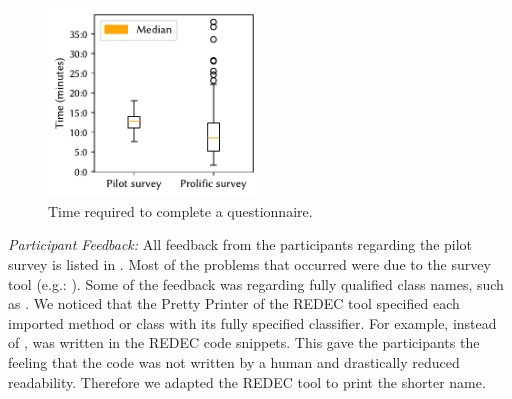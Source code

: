 \documentclass[%
class=scrreprt,
chapterprefix=false,%
open=right,%
twoside=true,%
paper=a4,%
logofile={Logo\_zentral\_farbig\_EN.png},%
thesistype=master,%
UKenglish,%
]{se2thesis}
\theoremstyle{definition}
\newcommand{\rdh}{REDEC\xspace}
\begin{document}
	\begin{figure}[tb]
		\centering
		\includegraphics[width=0.5\textwidth]{img/survey_times.pdf}
		\caption{Time required to complete a questionnaire.}
		\label{fig:survey_times}
	\end{figure}
		
	\textit{Participant Feedback:}
	All feedback from the participants regarding the pilot survey is listed in .
	Most of the problems that occurred were due to the survey tool (e.g.: ).
	Some of the feedback was regarding fully qualified class names, such as . We noticed that the Pretty Printer of the \rdh tool specified each imported method or class with its fully specified classifier. For example, instead of ,  was written in the \rdh code snippets. This gave the participants the feeling that the code was not written by a human and drastically reduced readability. Therefore we adapted the \rdh tool to print the shorter name.
	
\end{document}
